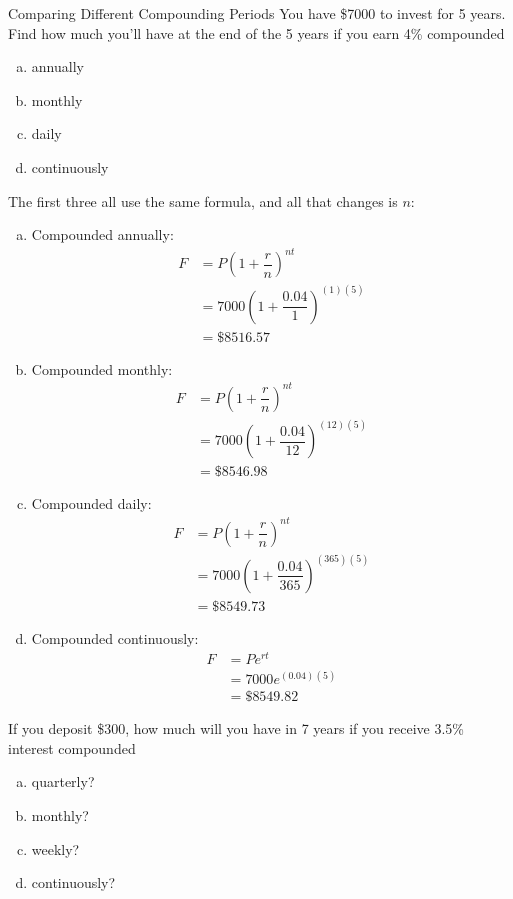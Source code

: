 \begin{example}[https://www.youtube.com/watch?v=OuC95ArdH5g]{Comparing Different Compounding Periods}
You have \$7000 to invest for 5 years.  Find how much you'll have at the end of the 5 years if you earn 4\% compounded
\begin{enumerate}[(a)]
\item annually
\item monthly
\item daily
\item continuously
\end{enumerate}
\vspace{0.2in}

The first three all use the same formula, and all that changes is $n$:
\begin{enumerate}[(a)]
\item Compounded annually:
\begin{align*}
F &= P\left(1+\dfrac{r}{n}\right)^{nt}\\
&= 7000\left(1+\dfrac{0.04}{1}\right)^{(1)(5)}\\
&= \$8516.57
\end{align*}

\item Compounded monthly:
\begin{align*}
F &= P\left(1+\dfrac{r}{n}\right)^{nt}\\
&= 7000\left(1+\dfrac{0.04}{12}\right)^{(12)(5)}\\
&= \$8546.98
\end{align*}

\item Compounded daily:
\begin{align*}
F &= P\left(1+\dfrac{r}{n}\right)^{nt}\\
&= 7000\left(1+\dfrac{0.04}{365}\right)^{(365)(5)}\\
&= \$8549.73
\end{align*}

\item Compounded continuously:
\begin{align*}
F &= Pe^{rt}\\
&= 7000e^{(0.04)(5)}\\
&= \$8549.82
\end{align*}
\end{enumerate}
\end{example}

\begin{try}
If you deposit \$300, how much will you have in 7 years if you receive 3.5\% interest compounded
\begin{enumerate}[(a)]
\item quarterly?
\item monthly?
\item weekly?
\item continuously?
\end{enumerate}
\end{try}
\vfill
\pagebreak

